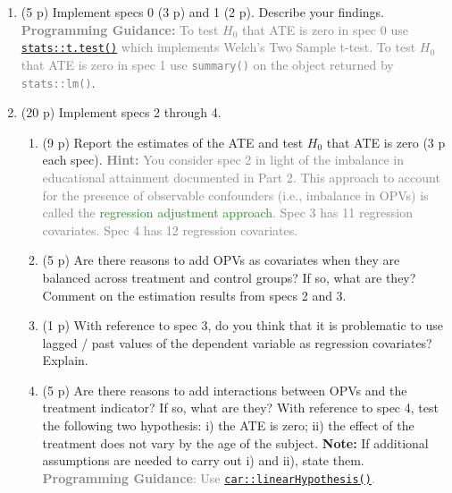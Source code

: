 \documentclass{article}
\begin{document}
\begin{enumerate}[label=\textbf{Q\arabic{enumi}}.,ref=Q\arabic{enumi}, wide=0pt, itemsep=1em, topsep=5pt]
\item (5 p) Implement specs 0 (3 p) and 1 (2 p). Describe your findings. \textcolor{gray}{\textbf{Programming Guidance:} To test $H_0$ that ATE is zero in spec 0 use \href{https://www.datacamp.com/tutorial/t-tests-r-tutorial}{\texttt{stats::t.test()}} which implements Welch's Two Sample t-test. To test $H_0$ that ATE is zero in spec 1 use \texttt{summary()} on the object returned by \texttt{stats::lm()}}.\label{item:oot:two-ways}

\item (20 p) Implement specs 2 through 4. 

\begin{enumerate}[wide, labelindent=0pt]

\item (9 p) Report the estimates of the ATE and test $H_0$ that ATE is zero (3 p each spec). \textcolor{gray}{\textbf{Hint:} You consider spec 2 in light of the imbalance in educational attainment documented in Part 2. This approach to account for the presence of observable confounders (i.e., imbalance in OPVs) is called the \textcolor{ForestGreen}{regression adjustment approach}. Spec 3 has 11 regression covariates. Spec 4 has 12 regression covariates.}

\item (5 p) Are there reasons to add OPVs as covariates when they are balanced across treatment and control groups? If so, what are they? Comment on the estimation results from specs 2 and 3.

\item (1 p) With reference to spec 3, do you think that it is problematic to use lagged / past values of the dependent variable as regression covariates? Explain.

\item (5 p) Are there reasons to add interactions between OPVs and the treatment indicator? If so, what are they? With reference to spec 4, test the following two hypothesis: i) the ATE is zero; ii) the effect of the treatment does not vary by the age of the subject. \textbf{Note:} If additional assumptions are needed to carry out i) and ii), state them. \textcolor{gray}{\textbf{Programming Guidance}: Use \href{https://rdrr.io/cran/car/man/linearHypothesis.html}{\texttt{car::linearHypothesis()}}.}
\end{enumerate}


\end{enumerate}
\end{document}
